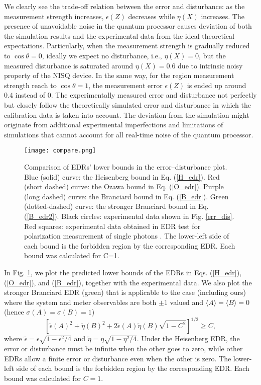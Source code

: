 \documentclass[%
reprint,
superscriptaddress,
 amsmath,amssymb,
 aps,
pra,
]{revtex4-2}
\begin{document}
We clearly see the trade-off relation between the error and disturbance: as the measurement strength increases, $\epsilon(Z)$ decreases while $\eta(X)$ increases. 
The presence of unavoidable noise in the quantum processor causes deviation of both the simulation results and the experimental data from the ideal theoretical expectations. 
Particularly, when the measurement strength is gradually reduced to $\cos \theta = 0$, ideally we expect no disturbance, i.e., $\eta(X)=0$, but the measured disturbance is saturated around $\eta(X) = 0.6$ due to intrinsic noisy property of the NISQ device. In the same way, for the region measurement strength reach to $\cos\theta = 1$, the measurement error $\epsilon(Z)$ is ended up around $0.4$ instead of 0. 
The experimentally measured error and disturbance not perfectly but closely follow the theoretically simulated error and disturbance in which the calibration data is taken into account.
The deviation from the simulation might originate from additional experimental imperfections and limitations of simulations that cannot account for all real-time noise of the quantum processor. 
\begin{figure}[t]%
\centering
\texttt{[image: compare.png]} 
\caption{Comparison of EDRs’ lower bounds in the error–disturbance plot. Blue (solid) curve: the Heisenberg bound in Eq. (\ref{H_edr}). Red (short dashed) curve: the Ozawa bound in Eq. (\ref{O_edr}). Purple (long dashed) curve: the Branciard bound in Eq. (\ref{B_edr}). Green (dotted-dashed) curve: the stronger Branciard bound in Eq. (\ref{B_edr2}). Black circles: experimental data shown in Fig. \ref{err_dis}. Red squares: experimental data obtained in EDR test for polarization measurement of single photons \cite{PhysRevLett.112.020402}. The lower-left side of each bound is the forbidden region by the corresponding EDR. Each bound was calculated for C=1.} 
\label{edr_lhs} 
 \end{figure}

In Fig. \ref{edr_lhs}, we plot the predicted lower bounds of the EDRs in Eqs. (\ref{H_edr}), (\ref{O_edr}), and (\ref{B_edr}), together with the experimental data. 
We also plot the stronger Branciard EDR (green) that is applicable to the case (including ours) where the system and meter observables are both $\pm1$ valued and $\langle A \rangle = \langle B \rangle = 0$ (hence $\sigma(A)=\sigma(B)=1$) \cite{branciard2013error}
\begin{equation}
\label{B_edr2}
\left[ \tilde{\epsilon}(A)^2+\tilde{\eta}(B)^2+2\tilde{\epsilon}(A)\tilde{\eta}(B)\sqrt{1-C^2}\right]^{1/2}  \geq C,
\end{equation}
where $\tilde{\epsilon}=\epsilon\sqrt{1-\epsilon^2/4}$ and $\tilde{\eta}=\eta\sqrt{1-\eta^2/4}$.
Under the Heisenberg EDR, the error or disturbance must be infinite when the other goes to zero, while other EDRs allow a finite error or disturbance even when the other is zero. 
The lower-left side of each bound is the forbidden region by the corresponding EDR. Each bound was calculated for $C=1$. 
\end{document}
